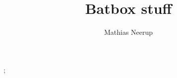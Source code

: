 \documentclass[10pt,a4paper]{memoir}
\author{Mathias Neerup}
\title{Batbox stuff}
\begin{document}
\maketitle
\tableofcontents

\frontmatter






\mainmatter
;




\listoftodos
\end{document}
